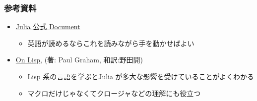 \begin{frame}[containsverbatim]
\frametitle{参考資料}
\begin{itemize}
  \item \href{http://docs.julialang.org/en/latest/manual/metaprogramming/}
    {Julia 公式 Document}
    \begin{itemize}
      \item 英語が読めるならこれを読みながら手を動かせばよい
    \end{itemize}
  \item \href{http://www.asahi-net.or.jp/~kc7k-nd/onlispjhtml/}
    {On Lisp}, (著: Paul Graham, 和訳:野田開)
    \begin{itemize}
      \item Lisp 系の言語を学ぶとJulia が多大な影響を受けていることがよくわかる
      \item マクロだけじゃなくてクロージャなどの理解にも役立つ
    \end{itemize}
\end{itemize}
\end{frame}

